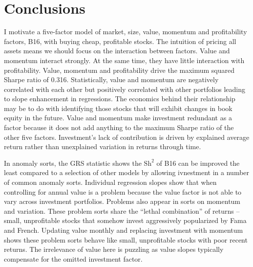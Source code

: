 
\section{Conclusions}

I motivate a five-factor model of market, size, value, momentum and
profitability factors, B16, with buying cheap, profitable stocks. The intuition
of pricing all assets means we should focus on the interaction between factors.
Value and momentum interact strongly. At the same time, they have little
interaction with profitability. Value, momentum and profitability drive the
maximum squared Sharpe ratio of 0.316. Statistically, value and momentum are
negatively correlated with each other but positively correlated with other
portfolios leading to slope enhancement in regressions. The economics behind
their relationship may be to do with identifying those stocks that will exhibit
changes in book equity in the future. Value and momentum make investment
redundant as a factor because it does not add anything to the maximum Sharpe
ratio of the other five factors. Investment's lack of contribution is driven by
explained average return rather than unexplained variation in returns through
time.

In anomaly sorts, the GRS statistic shows the $\text{Sh}^2$ of B16 can be
improved the least compared to a selection of other models by allowing
ivnestment in a number of common anomaly sorts. Individual regression slopes
show that when controlling for annual value is a problem because the value
factor is not able to vary across investment portfolios. Problems also appear
in sorts on momentum and variation. These problem sorts share the ``lethal
combination” of returns -- small, unprofitable stocks that somehow invest
aggressively popularized by Fama and French.
Updating value monthly and replacing investment with momentum shows these
problem sorts behave like small, unprofitable stocks with poor recent returns.
The irrelevance of value here is puzzling as value slopes typically
compensate for the omitted investment factor.

